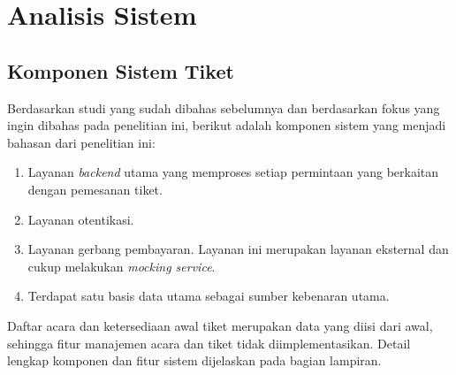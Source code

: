 \chapter{Analisis Sistem}

\section{Komponen Sistem Tiket}

Berdasarkan studi yang sudah dibahas sebelumnya dan berdasarkan fokus yang ingin dibahas pada penelitian ini, berikut adalah komponen sistem yang menjadi bahasan dari penelitian ini:

\begin{enumerate}
    \item Layanan \textit{backend} utama yang memproses setiap permintaan yang berkaitan dengan pemesanan tiket.
    \item Layanan otentikasi.
    \item Layanan gerbang pembayaran. Layanan ini merupakan layanan eksternal dan cukup melakukan \textit{mocking service}.
    \item Terdapat satu basis data utama sebagai sumber kebenaran utama.
\end{enumerate}

Daftar acara dan ketersediaan awal tiket merupakan data yang diisi dari awal, sehingga fitur manajemen acara dan tiket tidak diimplementasikan. Detail lengkap komponen dan fitur sistem dijelaskan pada bagian lampiran.
